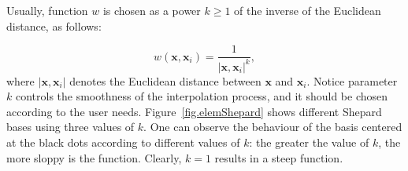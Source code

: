 Usually, function $w$ is chosen as a power $k\geq 1$ of the inverse of the Euclidean distance, as follows:

\begin{equation}
\label{eq.w}
	w(\textbf{x},\textbf{x}_i) = \frac{1}{\left|\textbf{x},\textbf{x}_i\right|^k},
\end{equation}
where $\left|\textbf{x},\textbf{x}_i\right|$ denotes the Euclidean distance between $\textbf{x}$ and $\textbf{x}_i$. Notice parameter $k$ controls the smoothness of the interpolation process, and it should be chosen according to the user needs. Figure~\ref{fig.elemShepard} shows different Shepard bases using three values of $k$. One can observe the behaviour of the basis centered at the black dots according to different values of $k$: the greater the value of $k$, the more sloppy is the function. Clearly, $k=1$ results in a steep function.

